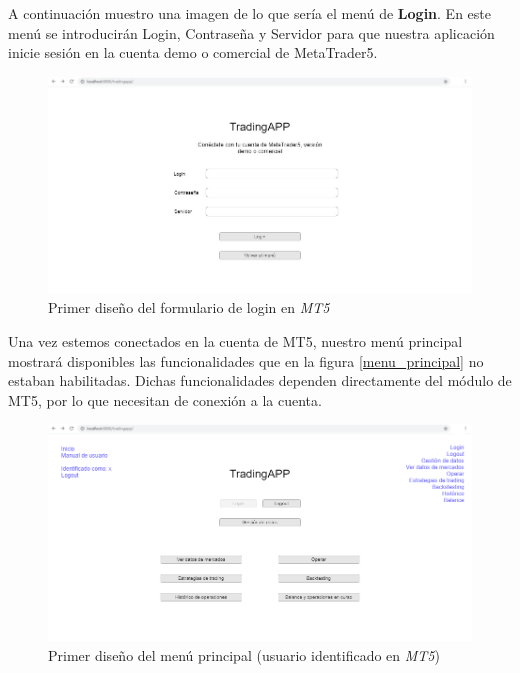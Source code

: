 A continuación muestro una imagen de lo que sería el menú de \textbf{Login}. En este menú se introducirán Login, Contraseña y Servidor para que nuestra aplicación inicie sesión en la cuenta demo o comercial de MetaTrader5.\newline

\begin{figure}[h]
	\includegraphics[width=1.2\textwidth]{imagenes/menu_login}
	\caption{Primer diseño del formulario de login en \textit{MT5}}
\end{figure}

Una vez estemos conectados en la cuenta de MT5, nuestro menú principal mostrará disponibles las funcionalidades que en la figura \ref{menu_principal} no estaban habilitadas. Dichas funcionalidades dependen directamente del módulo de MT5, por lo que necesitan de conexión a la cuenta. \newline

\begin{figure}[h]
	\includegraphics[width=1.2\textwidth]{imagenes/menu_principal_logued}
	\caption{Primer diseño del menú principal (usuario identificado en \textit{MT5}) }
\end{figure}



